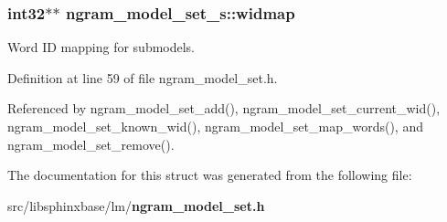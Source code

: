 \subsubsection[{widmap}]{\setlength{\rightskip}{0pt plus 5cm}int32$\ast$$\ast$ ngram\-\_\-model\-\_\-set\-\_\-s\-::widmap}\label{structngram__model__set__s_addebde44e2b7aa22dd82032c316fc962}


Word I\-D mapping for submodels. 



Definition at line 59 of file ngram\-\_\-model\-\_\-set.\-h.



Referenced by ngram\-\_\-model\-\_\-set\-\_\-add(), ngram\-\_\-model\-\_\-set\-\_\-current\-\_\-wid(), ngram\-\_\-model\-\_\-set\-\_\-known\-\_\-wid(), ngram\-\_\-model\-\_\-set\-\_\-map\-\_\-words(), and ngram\-\_\-model\-\_\-set\-\_\-remove().



The documentation for this struct was generated from the following file\-:\begin{DoxyCompactItemize}
\item 
src/libsphinxbase/lm/{\bf ngram\-\_\-model\-\_\-set.\-h}\end{DoxyCompactItemize}
